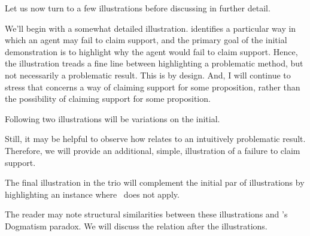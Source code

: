 \begin{note}
  Let us now turn to a few illustrations before discussing \nI{} in further detail.

  We'll begin with a somewhat detailed illustration.
  \nI{} identifies a particular way in which an agent may fail to claim support, and the primary goal of the initial demonstration is to highlight why the agent would fail to claim support.
  Hence, the illustration treads a fine line between highlighting a problematic method, but not necessarily a problematic result.
  This is by design.
  And, I will continue to stress that \nI{} concerns a way of claiming support for some proposition, rather than the possibility of claiming support for some proposition.

  Following two illustrations will be variations on the initial.

  Still, it may be helpful to observe how \nI{} relates to an intuitively problematic result.
  Therefore, we will provide an additional, simple, illustration of a failure to claim support.

  The final illustration in the trio will complement the initial par of illustrations by highlighting an instance where~\nI{} does not apply.

  The reader may note structural similarities between these illustrations and \citeauthor{Kripke:2011wv}'s Dogmatism paradox.
  We will discuss the relation after the illustrations.
\end{note}

